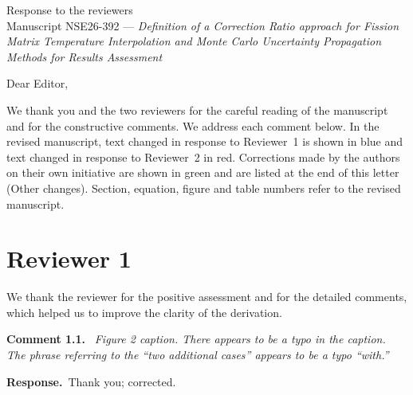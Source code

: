 \documentclass[11pt]{article}
\newenvironment{revcomment}[1]
  {\par\medskip\noindent\textbf{Comment #1.}\ \itshape}
  {\par}
\newcommand{\response}{\par\noindent\textbf{Response.}\ }
\begin{document}
\begin{center}
{\Large Response to the reviewers}\\[4pt]
Manuscript NSE26-392 --- \emph{Definition of a Correction Ratio approach for Fission Matrix
Temperature Interpolation and Monte Carlo Uncertainty Propagation Methods for Results Assessment}
\end{center}

\noindent Dear Editor,

We thank you and the two reviewers for the careful reading of the manuscript and for
the constructive comments. We address each comment below. In the revised manuscript,
text changed in response to Reviewer~1 is shown in {\color{blue}blue} and text changed
in response to Reviewer~2 in {\color{red}red}. Corrections made by the authors on their
own initiative are shown in {\color{green!50!black}green} and are listed at the end of
this letter (Other changes). Section, equation, figure and table numbers refer to the
revised manuscript.

\section*{Reviewer 1}

We thank the reviewer for the positive assessment and for the detailed comments,
which helped us to improve the clarity of the derivation.

\begin{revcomment}{1.1}
Figure 2 caption. There appears to be a typo in the caption. The phrase referring to
the ``two additional cases'' appears to be a typo ``with.''
\end{revcomment}
\response Thank you; corrected.
\end{document}
